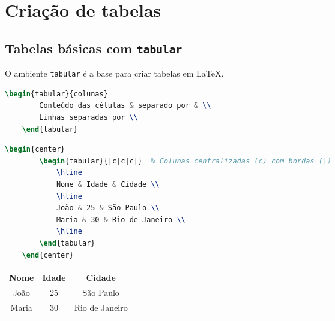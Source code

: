 \chapter{Criação de tabelas}



\section{Tabelas básicas com \texttt{tabular}}

O ambiente \verb|tabular| é a base para criar tabelas em LaTeX.

\begin{lstlisting}[language=tex, caption=Sintaxe básica para criação de tabelas]
    \begin{tabular}{colunas}
        Conteúdo das células & separado por & \\
        Linhas separadas por \\ 
    \end{tabular}
\end{lstlisting}

\begin{lstlisting}[language=tex, caption=Exemplo básico de tabela]
    \begin{center}
        \begin{tabular}{|c|c|c|}  % Colunas centralizadas (c) com bordas (|)
            \hline
            Nome & Idade & Cidade \\ 
            \hline
            João & 25 & São Paulo \\ 
            Maria & 30 & Rio de Janeiro \\ 
            \hline
        \end{tabular}
    \end{center}
\end{lstlisting}

\begin{center}
    \begin{tabular}{|c|c|c|}  %
        \hline
        Nome & Idade & Cidade \\ 
        \hline
        João & 25 & São Paulo \\ 
        Maria & 30 & Rio de Janeiro \\ 
        \hline
    \end{tabular}
\end{center}

